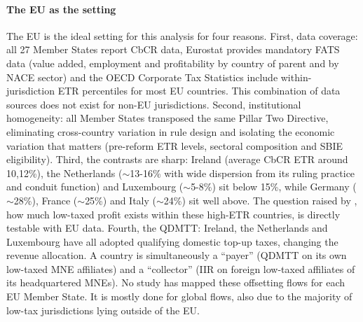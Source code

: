 \documentclass[11pt,a4paper]{article}
\begin{document}
\paragraph{The EU as the setting} The EU is the ideal setting for this analysis for four reasons. First, data coverage: all 27 Member States report CbCR data, Eurostat provides mandatory FATS data (value added, employment and profitability by country of parent and by NACE sector) and the OECD Corporate Tax Statistics include within-jurisdiction ETR percentiles for most EU countries. This combination of data sources does not exist for non-EU jurisdictions. Second, institutional homogeneity: all Member States transposed the same Pillar Two Directive, eliminating cross-country variation in rule design and isolating the economic variation that matters (pre-reform ETR levels, sectoral composition and SBIE eligibility). Third, the contrasts are sharp: Ireland (average CbCR ETR around 10,12\%), the Netherlands ($\sim$13-16\% with wide dispersion from its ruling practice and conduit function) and Luxembourg ($\sim$5-8\%) sit below 15\%, while Germany ($\sim$28\%), France ($\sim$25\%) and Italy ($\sim$24\%) sit well above. The question raised by \citeauthor{hugger2025}, how much low-taxed profit exists within these high-ETR countries, is directly testable with EU data. Fourth, the QDMTT: Ireland, the Netherlands and Luxembourg have all adopted qualifying domestic top-up taxes, changing the revenue allocation. A country is simultaneously a ``payer'' (QDMTT on its own low-taxed MNE affiliates) and a ``collector'' (IIR on foreign low-taxed affiliates of its headquartered MNEs). No study has mapped these offsetting flows for each EU Member State. It is mostly done for global flows, also due to the majority of low-tax jurisdictions lying outside of the EU. 
\end{document}

